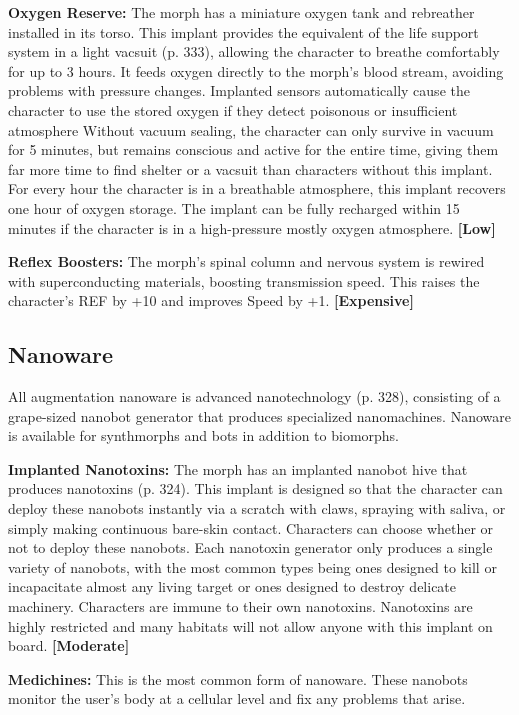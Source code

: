 \textbf{Oxygen Reserve: }The morph has a miniature 
oxygen tank and rebreather installed in its torso. This 
implant provides the equivalent of the life support 
system in a light vacsuit (p. 333), allowing the character
to breathe comfortably for up to 3 hours. It feeds
oxygen directly to the morph's blood stream, avoiding 
problems with pressure changes. Implanted sensors 
automatically cause the character to use the stored 
oxygen if they detect poisonous or insufficient atmosphere
Without vacuum sealing, the character can
only survive in vacuum for 5 minutes, but remains 
conscious and active for the entire time, giving them 
far more time to find shelter or a vacsuit than characters
without this implant. For every hour the character
is in a breathable atmosphere, this implant recovers 
one hour of oxygen storage. The implant can be fully 
recharged within 15 minutes if the character is in a 
high-pressure mostly oxygen atmosphere. \textbf{[Low]}

\textbf{Reflex Boosters:} The morph's spinal column and 
nervous system is rewired with superconducting 
materials, boosting transmission speed. This raises 
the character's REF by +10 and improves Speed by 
+1. \textbf{[Expensive]}

\subsection{Nanoware}

All augmentation nanoware is advanced nanotechnology
(p. 328), consisting of a grape-sized nanobot
generator that produces specialized nanomachines. 
Nanoware is available for synthmorphs and bots in 
addition to biomorphs.

\textbf{Implanted Nanotoxins:} The morph has an implanted
nanobot hive that produces nanotoxins (p.
324). This implant is designed so that the character 
can deploy these nanobots instantly via a scratch with 
claws, spraying with saliva, or simply making continuous
bare-skin contact. Characters can choose whether
or not to deploy these nanobots. Each nanotoxin 
generator only produces a single variety of nanobots, 
with the most common types being ones designed to 
kill or incapacitate almost any living target or ones 
designed to destroy delicate machinery. Characters 
are immune to their own nanotoxins. Nanotoxins 
are highly restricted and many habitats will not allow 
anyone with this implant on board. \textbf{[Moderate]}

\textbf{Medichines:  }This is the most common form of 
nanoware. These nanobots monitor the user's body at 
a cellular level and fix any problems that arise. 

